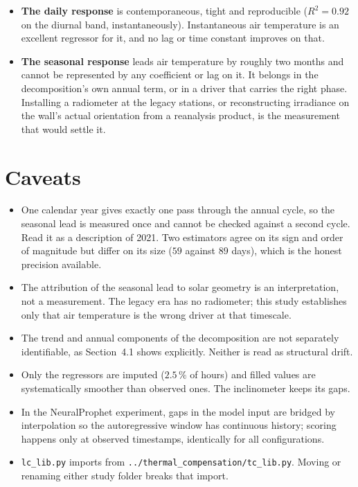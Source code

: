 \documentclass[11pt,a4paper]{article}
\begin{document}
\begin{itemize}
\item \textbf{The daily response} is contemporaneous, tight and reproducible
($R^2 = 0.92$ on the diurnal band, instantaneously). Instantaneous air temperature is an
excellent regressor for it, and no lag or time constant improves on that.
\item \textbf{The seasonal response} leads air temperature by roughly two months and
cannot be represented by any coefficient or lag on it. It belongs in the decomposition's
own annual term, or in a driver that carries the right phase. Installing a radiometer at
the legacy stations, or reconstructing irradiance on the wall's actual orientation from
a reanalysis product, is the measurement that would settle it.
\end{itemize}

\section{Caveats}

\begin{itemize}
\item One calendar year gives exactly one pass through the annual cycle, so the seasonal
lead is measured once and cannot be checked against a second cycle. Read it as a
description of 2021. Two estimators agree on its sign and order of magnitude but differ
on its size ($59$ against $89$ days), which is the honest precision available.
\item The attribution of the seasonal lead to solar geometry is an interpretation, not a
measurement. The legacy era has no radiometer; this study establishes only that air
temperature is the wrong driver at that timescale.
\item The trend and annual components of the decomposition are not separately
identifiable, as Section~4.1 shows explicitly. Neither is read as structural drift.
\item Only the regressors are imputed ($2.5\,\%$ of hours) and filled values are
systematically smoother than observed ones. The inclinometer keeps its gaps.
\item In the NeuralProphet experiment, gaps in the model input are bridged by
interpolation so the autoregressive window has continuous history; scoring happens only
at observed timestamps, identically for all configurations.
\item \texttt{lc\_lib.py} imports from \texttt{../thermal\_compensation/tc\_lib.py}.
Moving or renaming either study folder breaks that import.
\end{itemize}
\end{document}
